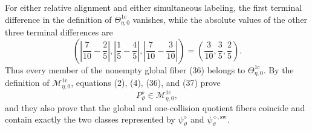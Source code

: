 For either relative alignment and either simultaneous labeling, the first terminal difference in the definition of \(\Theta_{\eta,0}^{1\mathrm c}\) vanishes, while the absolute values of the other three terminal differences are
\[
 \left(\left|\frac7{10}-\frac25\right|,
       \left|\frac15-\frac45\right|,
       \left|\frac7{10}-\frac3{10}\right|\right)
 =\left(\frac3{10},\frac35,\frac25\right).
 \tag{37}
\]
Thus every member of the nonempty global fiber (36) belongs to \(\Theta_{\eta,0}^{1\mathrm c}\).  By the definition of \(\mathcal M_{\eta,0}^{1\mathrm c}\), equations (2), (4), (36), and (37) prove
\[
 P^{\diamond}_{\vartheta}\in\mathcal M_{\eta,0}^{1\mathrm c},
 \]
and they also prove that the global and one-collision quotient fibers coincide and contain exactly the two classes represented by \(\psi^{\diamond}_{\vartheta}\) and \(\psi^{\diamond,\mathrm{sw}}_{\vartheta}\).

